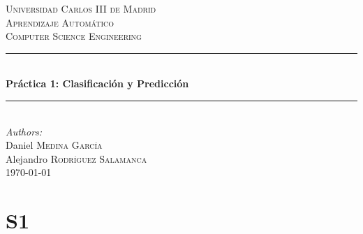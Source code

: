 \documentclass[12pt]{article}
\begin{document}
\begin{titlepage}

\newcommand{\HRule}{\rule{\linewidth}{0.5mm}} %

\center %


\textsc{\LARGE Universidad Carlos III de Madrid}\\[1.5cm] %
\textsc{\Large Aprendizaje Automático}\\[0.5cm] %
\textsc{\large Computer Science Engineering}\\[0.5cm] %


\HRule \\[0.4cm]
{ \huge \bfseries Práctica 1: Clasificación y Predicción}\\[0.4cm] %
\HRule \\[1.5cm]



\emph{Authors:}\\
Daniel \textsc{Medina García}\\ %
Alejandro \textsc{Rodríguez Salamanca}\\[3cm] %


{\large \today}\\[3cm] %




\vfill %

\end{titlepage}

\tableofcontents

\newpage

\section{S1}
\end{document}
